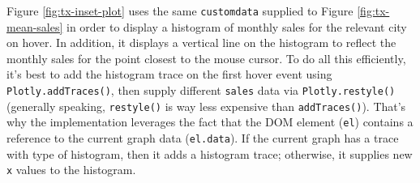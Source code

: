 \documentclass[
  12pt,
]{krantz}
\newenvironment{Shaded}{\begin{snugshade}}{\end{snugshade}}
\newcommand{\KeywordTok}[1]{\textcolor[rgb]{0.13,0.29,0.53}{\textbf{#1}}}
\newcommand{\NormalTok}[1]{#1}
\newcommand{\OperatorTok}[1]{\textcolor[rgb]{0.81,0.36,0.00}{\textbf{#1}}}
\newcommand{\StringTok}[1]{\textcolor[rgb]{0.31,0.60,0.02}{#1}}
\begin{document}
Figure \ref{fig:tx-inset-plot} uses the same \texttt{customdata} supplied to Figure \ref{fig:tx-mean-sales} in order to display a histogram of monthly sales for the relevant city on hover. In addition, it displays a vertical line on the histogram to reflect the monthly sales for the point closest to the mouse cursor. To do all this efficiently, it's best to add the histogram trace on the first hover event using \texttt{Plotly.addTraces()}, then supply different \texttt{sales} data via \texttt{Plotly.restyle()} (generally speaking, \texttt{restyle()} is way less expensive than \texttt{addTraces()}). That's why the implementation leverages the fact that the DOM element (\texttt{el}) contains a reference to the current graph data (\texttt{el.data}). If the current graph has a trace with type of histogram, then it adds a histogram trace; otherwise, it supplies new \texttt{x} values to the histogram.

\begin{Shaded}
\end{Shaded}
\end{document}

